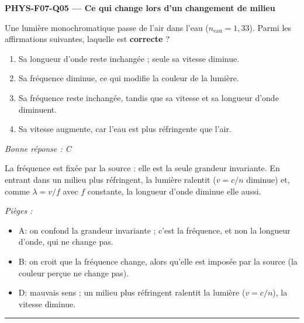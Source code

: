 \documentclass[11pt,a4paper]{article}
\begin{document}
\noindent\textbf{PHYS-F07-Q05 --- Ce qui change lors d'un changement de milieu}\par
Une lumière monochromatique passe de l'air dans l'eau ($n_{\text{eau}}=1{,}33$). Parmi les affirmations suivantes, laquelle est \textbf{correcte} ?
\begin{enumerate}[label=\Alph*)]
\item Sa longueur d'onde reste inchangée ; seule sa vitesse diminue.
\item Sa fréquence diminue, ce qui modifie la couleur de la lumière.
\item Sa fréquence reste inchangée, tandis que sa vitesse et sa longueur d'onde diminuent.
\item Sa vitesse augmente, car l'eau est plus réfringente que l'air.
\end{enumerate}
\textit{Bonne réponse : C}\par
La fréquence est fixée par la source : elle est la seule grandeur invariante. En entrant dans un milieu plus réfringent, la lumière ralentit ($v=c/n$ diminue) et, comme $\lambda=v/f$ avec $f$ constante, la longueur d'onde diminue elle aussi.\par
\textit{Pièges :}
\begin{itemize}
\item A: on confond la grandeur invariante ; c'est la fréquence, et non la longueur d'onde, qui ne change pas.
\item B: on croit que la fréquence change, alors qu'elle est imposée par la source (la couleur perçue ne change pas).
\item D: mauvais sens ; un milieu plus réfringent ralentit la lumière ($v=c/n$), la vitesse diminue.
\end{itemize}
\vspace{8pt}\hrule\vspace{8pt}
\end{document}
